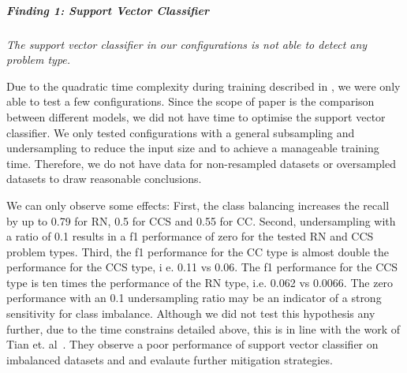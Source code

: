 \subparagraph{Finding 1: Support Vector Classifier} 
\textit{The support vector classifier in our configurations is not able to detect any problem type.}

Due to the quadratic time complexity during training described in , we were only able to test a few configurations. Since the scope of paper is the comparison between different models, we did not have time to optimise the support vector classifier. We only tested configurations with a general subsampling and undersampling to reduce the input size and to achieve a manageable training time. Therefore, we do not have data for non-resampled datasets or oversampled datasets to draw reasonable conclusions. 

We can only observe some effects:
First, the class balancing increases the recall by up to 0.79 for RN, 0.5 for CCS and 0.55 for CC. Second, undersampling with a ratio of 0.1 results in a f1 performance of zero for the tested RN and CCS problem types. Third, the f1 performance for the CC type is almost double the performance for the CCS type, i e. 0.11 vs 0.06. The f1 performance for the CCS type is ten times the performance of the RN type, i.e. 0.062 vs 0.0066. 
The zero performance with an 0.1 undersampling ratio may be an indicator of a strong sensitivity for class imbalance. Although we did not test this hypothesis any further, due to the time constrains detailed above, this is in line with the work of Tian et. al~\cite{tian_imbalanced_2011}. They observe a poor performance of support vector classifier on imbalanced datasets and and evalaute further mitigation strategies. 

\begin{center}
\end{center}


